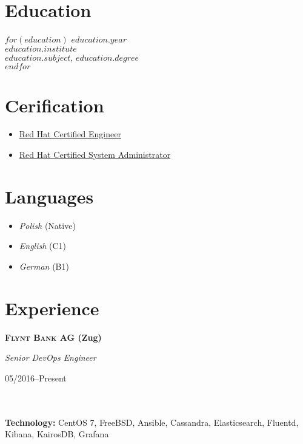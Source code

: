 \documentclass[$fontsize$, a4paper]{article}
\newcommand\textbox[1]{%
  \parbox{.333\textwidth}{#1}%
}
\begin{document}
\begin{multicols}{2}

\section*{Education}
$for(education)$
$education.year$\\
\emph{$education.institute$}\\
\textbf{$education.subject$}, $education.degree$\\

$endfor$

\columnbreak

\section*{Cerification}

\begin{itemize}
  \setlength\itemsep{-0.5em}
  \item \href{https://www.redhat.com/rhtapps/certification/verify/?certId=140-054-446}{Red Hat Certified Engineer}
  \item \href{https://www.redhat.com/rhtapps/certification/verify/?certId=140-054-446}{Red Hat Certified System Administrator}
\end{itemize}

\section*{Languages}
\begin{itemize}
  \setlength\itemsep{-0.5em}
  \item \emph{Polish} (Native)
  \item \emph{English} (C1)
  \item \emph{German} (B1)
\end{itemize}

\end{multicols}

\vspace{-10pt}


\section*{Experience}
\noindent

\noindent\textbox{\textbf{\textsc{Flynt Bank AG} (Zug)}\hfill}\textbox{\hfil \emph{Senior DevOps Engineer}\hfil}\textbox{\hfill 05/2016--Present}\\\\
\textbf{Technology:} CentOS 7, FreeBSD, Ansible, Cassandra, Elasticsearch, Fluentd, Kibana, KairosDB, Grafana
\end{document}
